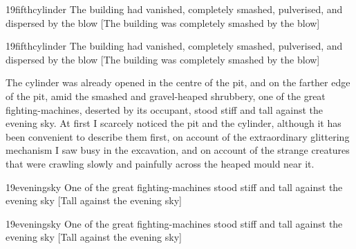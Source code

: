 
\begin{letter}
	\begin{bwbigpic}
		[1.2] 
		{19fifthcylinder} 
		{The building had vanished, completely smashed, pulverised, and dispersed by the blow}
		[The building was completely smashed by the blow]
	\end{bwbigpic}
\end{letter}

\begin{a4}
	\begin{bwbigpic}
		[1.1] 
		{19fifthcylinder} 
		{The building had vanished, completely smashed, pulverised, and dispersed by the blow}
		[The building was completely smashed by the blow]
	\end{bwbigpic}
\end{a4}
The cylinder was already opened in the centre of the pit, and on the farther edge of the pit, amid the smashed and gravel-heaped shrubbery, one of the great fighting-machines, deserted by its occupant, stood stiff and tall against the evening sky. At first I scarcely noticed the pit and the cylinder, although it has been convenient to describe them first, on account of the extraordinary glittering mechanism I saw busy in the excavation, and on account of the strange creatures that were crawling slowly and painfully across the heaped mould near it.



\begin{letter}
	\begin{bwbigpic}
		[1.2] 
		{19eveningsky} 
		{One of the great fighting-machines stood stiff and tall against the evening sky}
		[Tall against the evening sky]
	\end{bwbigpic}
\end{letter}

\begin{a4}
	\begin{bwbigpic}
		[1.1] 
		{19eveningsky} 
		{One of the great fighting-machines stood stiff and tall against the evening sky}
		[Tall against the evening sky]
	\end{bwbigpic}
\end{a4}


